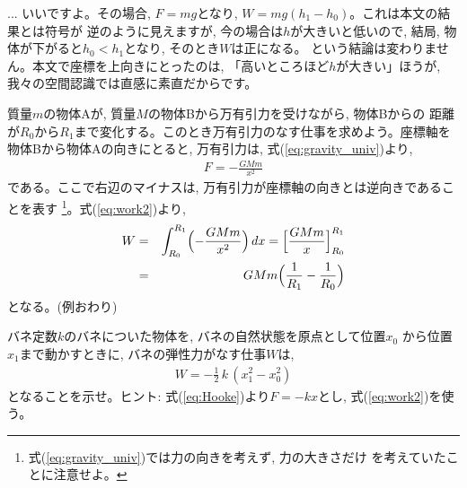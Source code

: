 \begin{faq}{\small{}
... いいですよ。その場合, $F=mg$となり, $W=mg(h_1-h_0)$。これは本文の結果とは符号が
逆のように見えますが, 今の場合は$h$が大きいと低いので, 結局, 物体が下がると$h_0<h_1$となり, 
そのとき$W$は正になる。 という結論は変わりません。本文で座標を上向きにとったのは, 
「高いところほど$h$が大きい」ほうが, 我々の空間認識では直感に素直だからです。}\end{faq}
\mv

\begin{exmpl}
質量$m$の物体Aが, 質量$M$の物体Bから万有引力を受けながら, 物体Bからの
距離が$R_0$から$R_1$まで変化する。このとき万有引力のなす仕事を求めよう。座標軸を
物体Bから物体Aの向きにとると, 万有引力は, 式(\ref{eq:gravity_univ})より, 
\begin{eqnarray}F=-\frac{GMm}{x^2}\end{eqnarray}
である。ここで右辺のマイナスは, 万有引力が座標軸の向きとは逆向きであることを表す
\footnote{式(\ref{eq:gravity_univ})では力の向きを考えず, 力の大きさだけ
を考えていたことに注意せよ。}。式(\ref{eq:work2})より, 
\begin{eqnarray}
W&=&\int_{R_0}^{R_1} \Bigl(-\frac{GMm}{x^2}\Bigr)\,dx=\Bigl[\frac{GMm}{x}\Bigr]_{R_0}^{R_1}\nonumber\\
 &=&GMm\Bigl(\frac{1}{R_1}-\frac{1}{R_0}\Bigr)\label{eq:work_gravity}
\end{eqnarray}
となる。(例おわり)
\end{exmpl}
\mv

%
\begin{q}\label{q:spring_work}
バネ定数$k$のバネについた物体を, バネの自然状態を原点として位置$x_0$
から位置$x_1$まで動かすときに, バネの弾性力がなす仕事$W$は, 
\begin{eqnarray}
W=-\frac{1}{2}\,k\,(x_1^2-x_0^2)\label{eq:spring_work}
\end{eqnarray}
となることを示せ。ヒント: 式(\ref{eq:Hooke})より$F=-kx$とし, 式(\ref{eq:work2})を使う。
\end{q}
\vspace{0.2cm}

